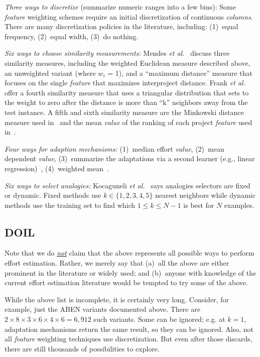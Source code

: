 \documentclass[10pt,conference]{IEEEtran}
\begin{document}
{\em Three ways to discretize} (summarize numeric ranges into a few bins):
Some {\em feature} weighting schemes require an initial discretization of continuous {\em columns}. There are many discretization policies in the literature, including:
(1)~equal frequency,
(2)~equal width, 
(3)~do nothing.

{\em Six ways to choose similarity measurements:}
Mendes {\it et al.}~\cite{mendes2003comparative} discuss three similarity measures, including the weighted Euclidean measure described above, an unweighted variant (where $w_i$ = 1), and a ``maximum distance'' measure that focuses on the single {\em feature} that maximizes interproject distance. Frank {\it et al.}~\cite{frank2002locally} offer a fourth similarity measure that uses a triangular distribution that sets to the weight to zero after the distance is more than ``k'' neighbors away from the test instance. A fifth and sixth similarity measure are the Minkowski distance measure used in~\cite{angelis2000simulation} and the mean {\em value} of the ranking of each project {\em feature} used in~\cite{walkerden1999empirical}.

{\em Four ways for adaption mechanisms:} 
(1)~median effort {\em value},
(2)~mean dependent {\em value},
(3)~summarize the adaptations via a second learner (e.g., linear regression)~\cite{li2009study,menzies2006selecting,baker2007hybrid,quinlan1992learning},
(4)~weighted mean~\cite{mendes2003comparative}.

{\em Six ways to select analogies:}
Kocaguneli {\it et al.}~\cite{teak2012}   says analogies selectors  are  fixed or dynamic. Fixed methods use $k\in\{1,2,3,4,5\}$
nearest neighbors
while  dynamic methods use the training set to find which $1 \le k \le N-1$ is best for   $N$ examples.\\



\subsection{DOIL}

  Note that we do \underline{{\em not}} claim that the above represents all possible ways to perform effort estimation. Rather, we merely say that (a)~all the above are either prominent in the literature or widely used; and (b)~anyone  with knowledge of  the current effort estimation 
literature would be tempted to try some of the above.

While the above list is incomplete, it is certainly very long. Consider, for example, just the ABEN
variants documented above. There are 
$2\times 8\times 3\times 6\times 4\times 6=6,912$ such variants.  Some   can be ignored;
e.g. at $k=1$,     adaptation mechanisms return the same result, so they can be ignored. Also, not all  {\em feature} weighting techniques use discretization. But even after those discards, there are still thousands of possibilities to explore. 
\end{document}

